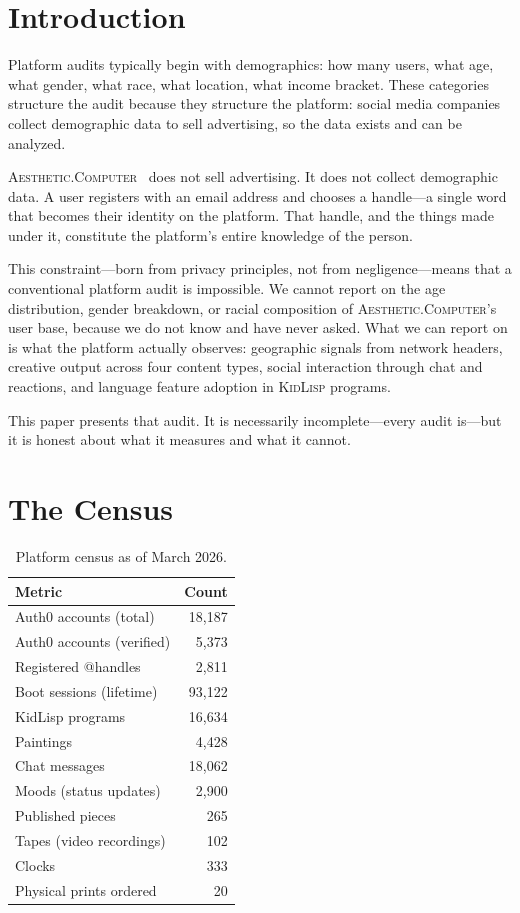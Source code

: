 \documentclass[10pt,letterpaper,twocolumn]{article}
\newcommand{\ac}{\textsc{Aesthetic.Computer}}
\newcommand{\kl}{\textsc{KidLisp}}
\begin{document}
\section{Introduction}

Platform audits typically begin with demographics: how many users, what age, what gender, what race, what location, what income bracket. These categories structure the audit because they structure the platform: social media companies collect demographic data to sell advertising, so the data exists and can be analyzed.

\ac{}~\citep{scudder2026ac} does not sell advertising. It does not collect demographic data. A user registers with an email address and chooses a handle---a single word that becomes their identity on the platform. That handle, and the things made under it, constitute the platform's entire knowledge of the person.

This constraint---born from privacy principles, not from negligence---means that a conventional platform audit is impossible. We cannot report on the age distribution, gender breakdown, or racial composition of \ac{}'s user base, because we do not know and have never asked. What we can report on is what the platform actually observes: geographic signals from network headers, creative output across four content types, social interaction through chat and reactions, and language feature adoption in \kl{} programs.

This paper presents that audit. It is necessarily incomplete---every audit is---but it is honest about what it measures and what it cannot.

\section{The Census}

\begin{table}[h]
\small
\centering
\begin{tabularx}{\columnwidth}{Xr}
\toprule
\textbf{Metric} & \textbf{Count} \\
\midrule
Auth0 accounts (total) & 18,187 \\
Auth0 accounts (verified) & 5,373 \\
Registered @handles & 2,811 \\
Boot sessions (lifetime) & 93,122 \\
\midrule
KidLisp programs & 16,634 \\
Paintings & 4,428 \\
Chat messages & 18,062 \\
Moods (status updates) & 2,900 \\
Published pieces & 265 \\
Tapes (video recordings) & 102 \\
Clocks & 333 \\
Physical prints ordered & 20 \\
\bottomrule
\end{tabularx}
\caption{Platform census as of March 2026.}
\label{tab:census}
\end{table}
\end{document}

